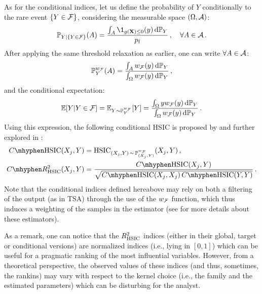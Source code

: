 As for the conditional indices, let us define the probability of $Y$ conditionally to the rare event $\{Y \in \mathcal{F}\}$, considering the measurable space $(\Omega, \mathcal{A})$:
\begin{equation}
    \P_{Y|\{Y\in\iF\}}(A) = \frac{\int_{A} \1_{g(\bX)\leq0}(y) \, \dd \P_Y}{\pf}\,, \quad \forall A \in \iA\,.
\end{equation}
After applying the same threshold relaxation as earlier, one can write $\forall A \in \mathcal{A}$: 
\begin{equation}
    \mathbb{P}_Y^{w_{\mathcal{F}}}(A)= \frac{\int_A w_{\mathcal{F}}(y) \, \mathrm{d} \mathbb{P}_Y}{\int_{\Omega} w_{\mathcal{F}}(y) \, \mathrm{d} \mathbb{P}_Y} \, ,
\end{equation}
and the conditional expectation: 
\begin{equation}
    \mathbb{E}[Y|Y \in \mathcal{F}] = \mathbb{E}_{Y\sim\mathbb{P}_Y^{w_{\mathcal{F}}}}[Y] = \frac{\int_\Omega y w_{\mathcal{F}}(y) \, \mathrm{d} \mathbb{P}_Y}{\int_{\Omega} w_{\mathcal{F}}(y) \, \mathrm{d} \mathbb{P}_Y}\, .
\end{equation}
Using this expression, the following conditional HSIC is proposed by \citet{marrel_2018} and further explored in \citet{marrel_chabridon_2021}:
\begin{subequations}
    \begin{align}
        C \mhyphen \HSIC(X_j, Y) & = \HSIC_{(X_j, Y) \,\sim\, \P_{(X_j, Y)}^{w_{\iF}}} (X_j, Y) \, ,\\
        C \mhyphen R^2_{\HSIC}(X_j, Y) &= \frac{C \mhyphen \HSIC(X_j, Y)}{\sqrt{C \mhyphen \HSIC(X_j, X_j) \, C \mhyphen \HSIC(Y, Y)}}\, .
    \end{align}
\end{subequations}
Note that the conditional indices defined hereabove may rely on both a filtering of the output (as in TSA) through the use of the $w_{\mathcal{F}}$ function, which thus induces a weighting of the samples in the estimator (see \citet{marrel_chabridon_2021} for more details about these estimators).

As a remark, one can notice that the $R^2_{\mathrm{HSIC}}$ indices (either in their global, target or conditional versions) are normalized indices (i.e., lying in $[0,1]$) which can be useful for a pragmatic ranking of the most influential variables. However, from a theoretical perspective, the observed values of these indices (and thus, sometimes, the rankins) may vary with respect to the kernel choice (i.e., the family and the estimated parameters) which can be disturbing for the analyst.

